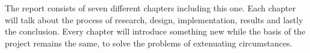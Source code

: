 \documentclass[../main.tex]{subfiles}
\begin{document}
\raggedright
The report consists of seven different chapters including this one.
Each chapter will talk about the process of research, design, implementation, results and lastly the conclusion. Every chapter will introduce something new while the basis of the project remains the same, to solve the problems of extenuating circumstances.
\end{document}
